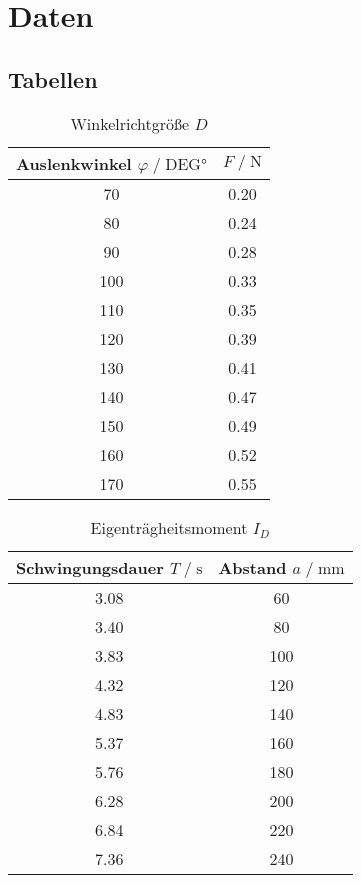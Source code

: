 \section{Daten}
\label{sec:Daten}

\subsection{Tabellen}


\begin{table}
    \centering
    \caption{Winkelrichtgröße $D$}
    \label{tab:winkelrichtgroesse}
    \begin{tabular}{c c}
        \toprule
        Auslenkwinkel $ \varphi \;/\; \text{DEG}\si{\degree}$ & $F \;/\; \si{\newton}$ \\
        \midrule
        70 & 0.20 \\
        80 & 0.24 \\
        90 & 0.28 \\
        100 & 0.33 \\
        110 & 0.35 \\
        120 & 0.39 \\
        130 & 0.41 \\
        140 & 0.47 \\
        150 & 0.49 \\
        160 & 0.52 \\
        170 & 0.55 \\
        \bottomrule
    \end{tabular}
\end{table}


\begin{table}
   \centering
    \caption{Eigenträgheitsmoment $I_D$}
    \label{tab:eigentraegheitsmoment}
    \begin{tabular}{c c}
        \toprule
        Schwingungsdauer $ T \;/\; \si{\second}$ & Abstand $a \;/\; \si{\milli\meter}$ \\
        \midrule
        3.08 & 60 \\
        3.40 & 80 \\
        3.83 & 100 \\
        4.32 & 120 \\
        4.83 & 140 \\
        5.37 & 160 \\
        5.76 & 180 \\
        6.28 & 200 \\
        6.84 & 220 \\
        7.36 & 240 \\
        \bottomrule
    \end{tabular}
\end{table}

